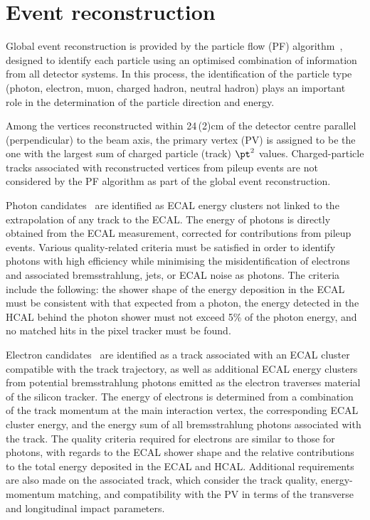 \section{Event reconstruction}
\label{sec:event_reconstruction}

Global event reconstruction is provided by the particle flow (PF)
algorithm~\cite{CMS-PAS-PFT-09-001,CMS-PAS-PFT-10-001}, designed to
identify each particle using an optimised combination of information
from all detector systems. In this process, the identification of the
particle type (photon, electron, muon, charged hadron, neutral hadron)
plays an important role in the determination of the particle direction
and energy.

Among the vertices reconstructed within 24\,(2)\unit{cm} of the
detector centre parallel (perpendicular) to the beam axis, the primary
vertex (PV) is assigned to be the one with the largest sum of charged
particle (track) $\pt^2$ values.
Charged-particle tracks associated with reconstructed vertices from
pileup events are not considered by the PF algorithm as part of the
global event reconstruction.

Photon candidates~\cite{CMS:EGM-14-001} are identified as ECAL energy
clusters not linked to the extrapolation of any track to the ECAL. The
energy of photons is directly obtained from the ECAL measurement,
corrected for contributions from pileup events.  Various
quality-related criteria must be satisfied in order to identify
photons with high efficiency while minimising the misidentification of
electrons and associated bremsstrahlung, jets, or ECAL noise as
photons. The criteria include the following: the shower shape of the
energy deposition in the ECAL must be consistent with that expected
from a photon, the energy detected in the HCAL behind the photon
shower must not exceed 5\% of the photon energy, and no matched hits
in the pixel tracker must be found.

Electron candidates~\cite{Khachatryan:2015hwa} are identified as a
track associated with an ECAL cluster compatible with
the track trajectory, as well as additional ECAL energy clusters from
potential bremsstrahlung photons emitted as the electron traverses
material of the silicon tracker. The energy of electrons is determined
from a combination of the track momentum at the main interaction
vertex, the corresponding ECAL cluster energy, and the energy sum of
all bremsstrahlung photons associated with the track. The quality
criteria required for electrons are similar to those for photons, with
regards to the ECAL shower shape and the relative contributions to the
total energy deposited in the ECAL and HCAL. Additional requirements
are also made on the associated track, which consider the track
quality, energy-momentum matching, and compatibility with the PV in
terms of the transverse and longitudinal impact parameters.

